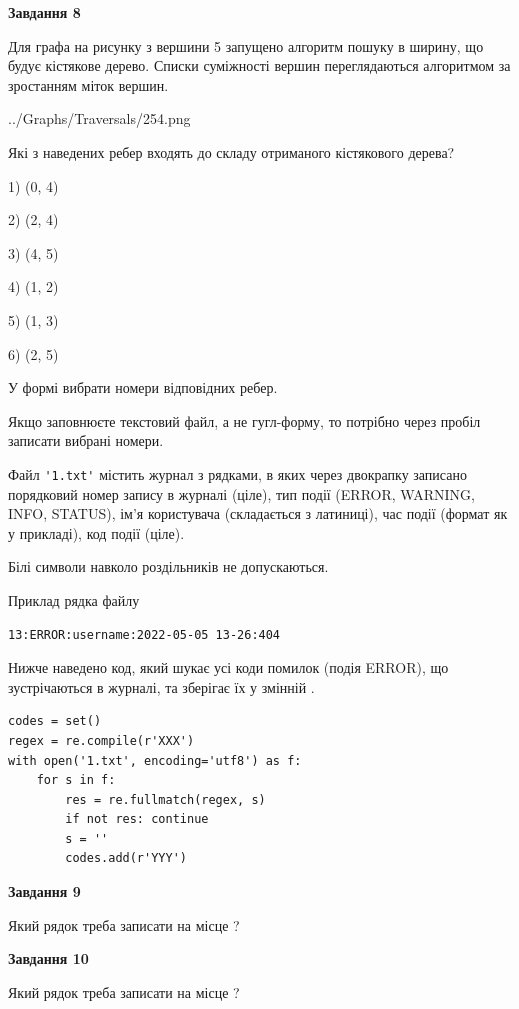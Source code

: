 \documentclass[12pt, ukrainian]{article}
\def\code#1{\Verb!#1!}
\begin{document}
{\begin {large}
{\begin {center}\textbf{Завдання 8}\end {center}}\par
Для графа на рисунку з вершини 5 запущено алгоритм пошуку в ширину, що будує кістякове дерево. Списки суміжності вершин переглядаються алгоритмом за зростанням міток вершин.\par
\begin{center}
	{../Graphs/Traversals/254.png}
\end{center}
\par Які з наведених ребер входять до складу отриманого кістякового дерева?\par
1) (0, 4)\par
2) (2, 4)\par
3) (4, 5)\par
4) (1, 2)\par
5) (1, 3)\par
6) (2, 5)\par
{\vskip 15pt} У формі вибрати номери відповідних ребер.


Якщо заповнюєте текстовий файл, а не гугл-форму, то потрібно через пробіл записа\-ти вибрані номери.\par
\newpage


Файл \code{'1.txt'} містить журнал з рядками, в яких через двокрапку записано поряд\-ко\-вий номер запису в журналі (ціле), тип події (ERROR, WARNING, INFO, STATUS), ім'я користувача (складається з латиниці), час події (фор\-мат як у прикладі), код події (ціле).

Білі символи навколо роздільників не допускаються.

Приклад рядка файлу



\begin{verbatim}
13:ERROR:username:2022-05-05 13-26:404
\end{verbatim}


Нижче наведено код, який шукає усі коди помилок (подія ERROR), що зустріча\-ють\-ся в журналі, та зберігає їх у змінній .



\begin{verbatim}
codes = set()
regex = re.compile(r'XXX')
with open('1.txt', encoding='utf8') as f:
    for s in f:
        res = re.fullmatch(regex, s)
        if not res: continue
        s = ''
        codes.add(r'YYY')
\end{verbatim}


{\begin {center}\textbf{Завдання 9}\end {center}}\par
Який рядок треба записати на місце  ?\par
\vspace{5mm}


{\begin {center}\textbf{Завдання 10}\end {center}}\par
Який рядок треба записати на місце  ?\par


\newpage


\end {large}}
\end{document}
